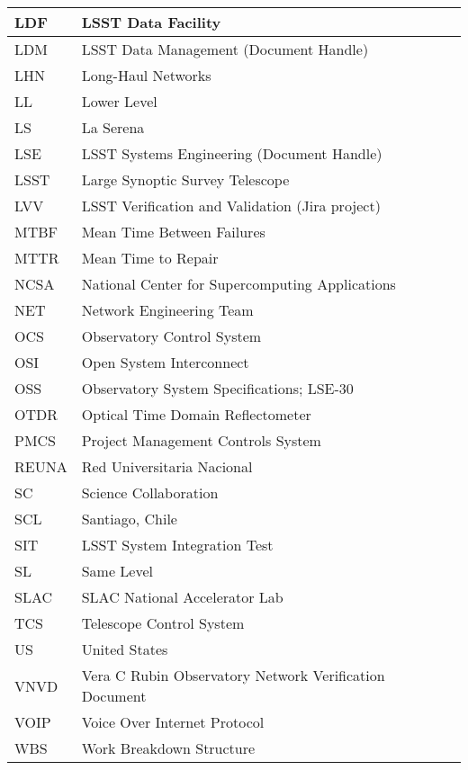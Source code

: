 \begin{longtable}{p{}p{}}
LDF & LSST Data Facility \\\hline
LDM & LSST Data Management (Document Handle) \\\hline
LHN & Long-Haul Networks \\\hline
LL & Lower Level \\\hline
LS & La Serena \\\hline
LSE & LSST Systems Engineering (Document Handle) \\\hline
LSST & Large Synoptic Survey Telescope \\\hline
LVV & LSST Verification and Validation (Jira project) \\\hline
MTBF & Mean Time Between Failures \\\hline
MTTR & Mean Time to Repair \\\hline
NCSA & National Center for Supercomputing Applications \\\hline
NET & Network Engineering Team \\\hline
OCS & Observatory Control System \\\hline
OSI & Open System Interconnect \\\hline
OSS & Observatory System Specifications; LSE-30 \\\hline
OTDR & Optical Time Domain Reflectometer \\\hline
PMCS & Project Management Controls System \\\hline
REUNA & Red Universitaria Nacional \\\hline
SC & Science Collaboration \\\hline
SCL & Santiago, Chile \\\hline
SIT & LSST System Integration Test \\\hline
SL & Same Level \\\hline
SLAC & SLAC National Accelerator Lab \\\hline
TCS & Telescope Control System \\\hline
US & United States \\\hline
VNVD & Vera C Rubin Observatory Network Verification Document \\\hline
VOIP & Voice Over Internet Protocol \\\hline
WBS & Work Breakdown Structure \\\hline
\end{longtable}

